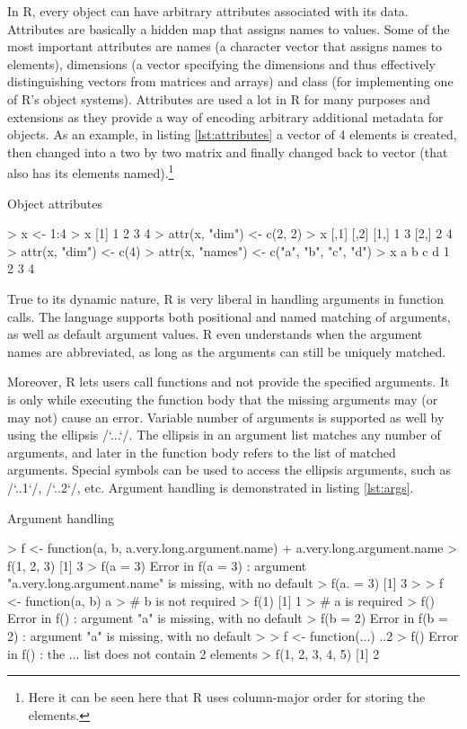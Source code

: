 {In R, every object can have arbitrary attributes associated with its data. Attributes are basically a hidden map that assigns names to values. Some of the most important attributes are names (a character vector that assigns names to elements), dimensions (a vector specifying the dimensions and thus effectively distinguishing vectors from matrices and arrays) and class (for implementing one of R's object systems). Attributes are used a lot in R for many purposes and extensions as they provide a way of encoding arbitrary additional metadata for objects. As an example, in listing \ref{lst:attributes} a vector of 4 elements is created, then changed into a two by two matrix and finally changed back to vector (that also has its elements named).\footnote{Here it can be seen here that R uses column-major order for storing the elements.}

\begin{listing}[htbp]
  \caption{\label{lst:attributes}Object attributes}
  \begin{rcode}
> x <- 1:4
> x
[1] 1 2 3 4
> attr(x, "dim") <- c(2, 2)
> x
     [,1] [,2]
[1,]    1    3
[2,]    2    4
> attr(x, "dim") <- c(4)
> attr(x, "names") <- c("a", "b", "c", "d")
> x
a b c d 
1 2 3 4 
  \end{rcode}
\end{listing}

True to its dynamic nature, R is very liberal in handling arguments in function calls. The language supports both positional and named matching of arguments, as well as default argument values. R even understands when the argument names are abbreviated, as long as the arguments can still be uniquely matched.

Moreover, R lets users call functions and not provide the specified arguments. It is only while executing the function body that the missing arguments may (or may not) cause an error. Variable number of arguments is supported as well by using the ellipsis \rinline/`...`/. The ellipsis in an argument list matches any number of arguments, and later in the function body refers to the list of matched arguments. Special symbols can be used to access the ellipsis arguments, such as \rinline/`..1`/, \rinline/`..2`/, etc. Argument handling is demonstrated in listing \ref{lst:args}.

\begin{listing}[htbp]
  \caption{\label{lst:args}Argument handling}
  \begin{rcode}
> f <- function(a, b, a.very.long.argument.name)
+     a.very.long.argument.name
> f(1, 2, 3)
[1] 3
> f(a = 3)
Error in f(a = 3) : 
  argument "a.very.long.argument.name" is missing, with no default
> f(a. = 3)
[1] 3
>
> f <- function(a, b) a
> # b is not required
> f(1)
[1] 1
> # a is required
> f()
Error in f() : argument "a" is missing, with no default
> f(b = 2)
Error in f(b = 2) : argument "a" is missing, with no default
>
> f <- function(...) ..2
> f()
Error in f() : the ... list does not contain 2 elements
> f(1, 2, 3, 4, 5)
[1] 2
  \end{rcode}
\end{listing}

}
